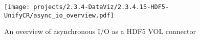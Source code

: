 
\begin{wrapfigure}{r}{0.51\textwidth}
  \begin{center}
    \texttt{[image: projects/2.3.4-DataViz/2.3.4.15-HDF5-UnifyCR/async\_io\_overview.pdf]}
  \end{center}
  \caption{An overview of asynchronous I/O as a HDF5 VOL connector}
  \label{fig:asyncio-overview}
\end{wrapfigure}


